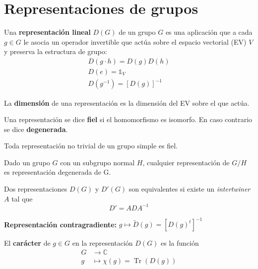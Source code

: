 \section{Representaciones de grupos}
\begin{definicion}
Una \textbf{representación lineal} $D(G)$ de un grupo $G$ es una aplicación que a cada $g\in G$ le asocia un operador invertible que actúa sobre el espacio vectorial (EV) $V$ y preserva la estructura de grupo:
\begin{subequations}
\begin{gather}
D(g\cdot h)= D(g) D(h)\\
D(e)= \mathbb{1}_V\\
D(g^{-1})= \left[D(g)\right]^{-1}
\end{gather}
\end{subequations}

La \textbf{dimensión} de una representación es la dimensión del EV sobre el que actúa. \medskip

Una representación se dice \textbf{fiel} si el homomorfismo es isomorfo. En caso contrario se dice \textbf{degenerada}.
\end{definicion}

\begin{proposicion}
Toda representación no trivial de un grupo simple es fiel.
\end{proposicion}

\begin{proposicion}
Dado un grupo $G$ con un subgrupo normal $H$, cualquier representación de $G/H$ es representación degenerada de G.
\end{proposicion}

\begin{definicion}
Dos representaciones $D(G)$ y $D'(G)$ son equivalentes si existe un \emph{intertwiner} $A$ tal que
\begin{equation}
D'=ADA^{-1}
\end{equation}
\end{definicion}

\begin{flushleft}
\textbf{Representación contragradiente:} $g\mapsto \tilde{D}(g)=\left[D(g)^t\right]^{-1}$ 
\end{flushleft}


\begin{definicion}
El \textbf{carácter} de $g\in G$ en la representación $D(G)$ es la función 
\begin{subequations}
\begin{flalign}
G&\rightarrow \mathbb{C}\\
g&\mapsto \chi(g)=\operatorname{Tr}(D(g))
\end{flalign}
\end{subequations}
\end{definicion}

